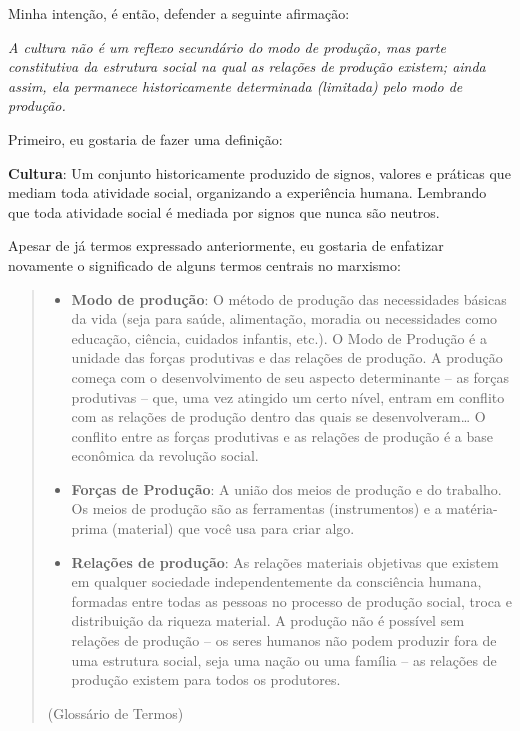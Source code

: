 Minha intenção, é então, defender a seguinte afirmação:

\textit{A cultura não é um reflexo secundário do modo de produção, mas parte constitutiva da estrutura social na qual as relações de produção existem; ainda assim, ela permanece historicamente determinada (limitada) pelo modo de produção.}

Primeiro, eu gostaria de fazer uma definição:

\textbf{Cultura}: Um conjunto historicamente produzido de signos, valores e práticas que mediam toda atividade social, organizando a experiência humana. Lembrando que toda atividade social é mediada por signos que nunca são neutros.

Apesar de já termos expressado anteriormente, eu gostaria de enfatizar novamente o significado de alguns termos centrais no marxismo:

\begin{quote}
\begin{itemize}
\item \textbf{Modo de produção}: O método de produção das necessidades básicas da vida (seja para saúde, alimentação, moradia ou necessidades como educação, ciência, cuidados infantis, etc.). O Modo de Produção é a unidade das forças produtivas e das relações de produção. A produção começa com o desenvolvimento de seu aspecto determinante – as forças produtivas – que, uma vez atingido um certo nível, entram em conflito com as relações de produção dentro das quais se desenvolveram… O conflito entre as forças produtivas e as relações de produção é a base econômica da revolução social.

\item \textbf{Forças de Produção}: A união dos meios de produção e do trabalho. Os meios de produção são as ferramentas (instrumentos) e a matéria-prima (material) que você usa para criar algo.

\item \textbf{Relações de produção}: As relações materiais objetivas que existem em qualquer sociedade independentemente da consciência humana, formadas entre todas as pessoas no processo de produção social, troca e distribuição da riqueza material. A produção não é possível sem relações de produção – os seres humanos não podem produzir fora de uma estrutura social, seja uma nação ou uma família – as relações de produção existem para todos os produtores.
\end{itemize}
(Glossário de Termos)
\end{quote}

